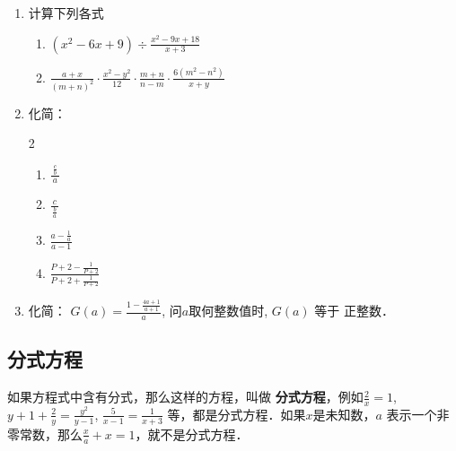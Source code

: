 \begin{ex}
\begin{enumerate} 
\item 计算下列各式
\begin{enumerate}
    \item  $\left(x^{2}-6 x+9\right) \div \frac{x^{2}-9 x+18}{x+3}$
    \item $\frac{a+x}{(m+n)^{2}} \cdot \frac{x^{2}-y^{2}}{12} \cdot \frac{m+n}{n-m} \cdot \frac{6\left(m^{2}-n^{2}\right)}{x+y}$
\end{enumerate}
\item 化简：
\begin{multicols}{2}
\begin{enumerate}
    \item $\frac{\frac{c}{b}}{\ a\ }$
    \item $\frac{\ c\ }{\frac{b}{a}}$
    \item $\frac{a-\frac{1}{a}}{a-1}$
    \item $\frac{P+2-\frac{1}{P+2}}{P+2+\frac{1}{P+2}}$
\end{enumerate}
\end{multicols}
\item 化简： $G(a)=\frac{1-\frac{4 a+1}{a+1}}{a}$, 问$a$取何整数值时, $G(a)$ 等于 正整数．
\end{enumerate}
\end{ex}

\subsection{分式方程}
如果方程式中含有分式，那么这样的方程，叫做
\textbf{分式方程}，例如$\frac{2}{x}=1$, $y+1+\frac{2}{y}=\frac{y^2}{y-1}$, $\frac{5}{x-1}=\frac{1}{x+3}$
等，都是分式方程．如果$x$是未知数，$a$
表示一个非零常数，那么$\frac{x}{a}+x=1$，就不是分式方程．


